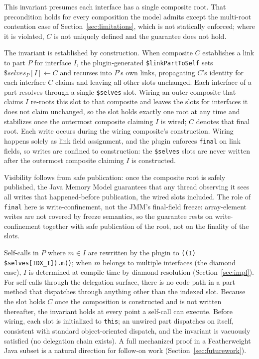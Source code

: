 \documentclass[acmsmall,nonacm]{acmart}
\theoremstyle{acmplain}
\theoremstyle{acmdefinition}
\newcommand{\code}[1]{\texttt{#1}}
\begin{document}
This invariant presumes each interface has a single composite root. That
precondition holds for every composition the model admits except the multi-root
contention case of Section~\ref{sec:limitations}, which is not statically
enforced; where it is violated, $C$ is not uniquely defined and the guarantee
does not hold.

The invariant is established by construction. When composite $C$ establishes
a link to part $P$ for interface $I$, the plugin-generated
\code{\$linkPartToSelf} sets $\$\mathit{selves}_P[I] \leftarrow C$ and
recurses into $P$'s own links, propagating $C$'s identity for each interface
$C$ claims and leaving all other slots unchanged. Each interface of a part resolves
through a single \code{\$selves} slot. Wiring an outer composite that claims
$I$ re-roots this slot to that composite and leaves the slots for interfaces it
does not claim unchanged, so the slot holds exactly one root at any time and
stabilizes once the outermost composite claiming $I$ is wired; $C$ denotes that
final root. Each write occurs during the wiring composite's construction. Wiring happens solely
as link field assignment, and the plugin enforces \code{final} on link
fields, so writes are confined to construction: the \code{\$selves} slots are never
written after the outermost composite claiming $I$ is constructed.

Visibility follows from safe publication: once the composite root is safely published, the
Java Memory Model guarantees that any thread observing it sees all writes that
happened-before publication, the wired slots included. The role of \code{final}
here is write-confinement, not the JMM's final-field freeze: array-element writes
are not covered by freeze semantics, so the guarantee rests on write-confinement
together with safe publication of the root, not on the finality of the slots.

Self-calls in $P$ where $m \in I$ are rewritten by
the plugin to \code{((I)\,\$selves[IDX\_I]).m()}; when $m$ belongs to multiple
interfaces (the diamond case), $I$ is determined at compile time by diamond
resolution (Section~\ref{sec:impl}). For self-calls through the delegation surface, there is no code path in a
part method that dispatches through anything other than the indexed
slot. Because the slot holds $C$ once the composition is constructed and is not
written thereafter, the invariant holds at every point a self-call can execute.
Before wiring, each slot is initialized to \code{this}; an unwired part
dispatches on itself, consistent with standard object-oriented dispatch, and
the invariant is vacuously satisfied (no delegation chain exists).
A full mechanized proof in a Featherweight Java subset is a natural direction
for follow-on work (Section~\ref{sec:futurework}).
\end{document}
